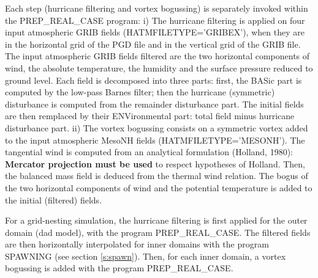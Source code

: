 Each step (hurricane filtering and vortex bogussing) is separately invoked
within \\
the PREP\_REAL\_CASE program:
\subitem
i) The hurricane filtering is applied on four input atmospheric GRIB fields
(HATMFILETYPE='GRIBEX'), when they are in the horizontal grid of the PGD file
and in the vertical grid of the GRIB file. The input atmospheric GRIB fields 
filtered are the two horizontal components of wind, the absolute temperature,
the humidity 
and the surface pressure reduced to ground level. Each field is decomposed 
into three parts: first, the BASic part is computed by the low-pass Barnes
filter; then the hurricane (symmetric) disturbance is computed from the 
remainder disturbance part. The initial fields are then remplaced by their 
ENVironmental part: total field minus hurricane disturbance part.
\subitem
ii) The vortex bogussing consists on a symmetric vortex added to the input
atmospheric MesoNH fields (HATMFILETYPE='MESONH'). 
The tangential wind is computed from an analytical formulation (Holland, 1980):
{\bf Mercator projection must be used} to respect hypotheses of Holland.
Then, the balanced mass field is deduced
from the thermal wind relation. The bogus of the two horizontal components of
wind and the potential temperature is added to the initial (filtered) fields.

For a grid-nesting simulation, the hurricane filtering is first applied for
the outer domain (dad model), with the program PREP\_REAL\_CASE.
The filtered fields are then horizontally interpolated for inner domains
with the program SPAWNING (see section \ref{s:spawn}). 
Then, for each inner domain, a vortex bogussing is added with the program
PREP\_REAL\_CASE.

